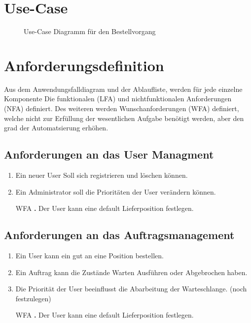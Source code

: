 \section{Use-Case}
\begin{figure}[!ht]
\caption{Use-Case Diagramm für den Bestellvorgang}
\label{fig:use-case}
\end{figure}

\section{Anforderungsdefinition}
Aus dem Anwendungsfalldiagram und der Ablaufliste, werden für jede einzelne Komponente Die funktionalen (LFA) und nichtfunktionalen Anforderungen (NFA) definiert.
Des weiteren werden Wunschanforderungen (WFA) definiert, welche nicht zur Erfüllung der wesentlichen Aufgabe benötigt werden, aber den grad der Automatsierung erhöhen.%

\subsection{Anforderungen an das User Managment}
\begin{enumerate}[nosep,style=sameline]
\renewcommand{\labelenumi}{LFA \textbf{\theenumi.}}
\item Ein neuer User Soll sich registrieren und löschen können.
\item Ein Administrator soll die Prioritäten der User verändern können.
\item[WFA \textbf{\theenumi.}] Der User kann eine default Lieferposition festlegen.
\end{enumerate}

\subsection{Anforderungen an das Auftragsmanagement}
\begin{enumerate}[nosep,style=sameline]
\renewcommand{\labelenumi}{LFA \textbf{\theenumi.}}
\item Ein User kann ein gut an eine Position bestellen.
\item Ein Auftrag kann die Zustände Warten Ausführen oder Abgebrochen haben.
\item Die Priorität der User beeinflusst die Abarbeitung der Warteschlange. (noch festzulegen)
\item[WFA \textbf{\theenumi.}] Der User kann eine default Lieferposition festlegen.
\end{enumerate}

